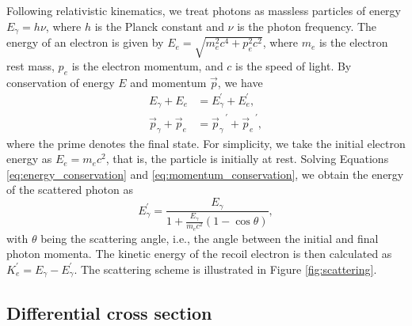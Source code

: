 \documentclass[aps,twocolumn,secnumarabic,balancelastpage,amsmath,amssymb,nofootinbib,floatfix]{revtex4-1}
\begin{document}
Following relativistic kinematics, we treat photons as massless particles of energy $E_\gamma = h \nu$, where $h$ is the Planck constant and $\nu$ is the photon frequency. The energy of an electron is given by $E_e = \sqrt{m_e^2 c^4 + p_e^2 c^2}$, where $m_e$ is the electron rest mass, $p_e$ is the electron momentum, and $c$ is the speed of light. By conservation of energy $E$ and momentum $\vec{p}$, we have
\begin{align}
    \label{eq:energy_conservation}
    E_\gamma + E_e &= E_\gamma^{\prime} + E_e^{\prime}, \\
    \label{eq:momentum_conservation}
    \vec{p}_\gamma + \vec{p}_e &= {\vec{p}_\gamma}^{\,\prime} + {\vec{p}_e}^{\,\prime},
\end{align}
where the prime denotes the final state. For simplicity, we take the initial electron energy as $E_e = m_e c^2$, that is, the particle is initially at rest. Solving Equations \eqref{eq:energy_conservation} and \eqref{eq:momentum_conservation}, we obtain the energy of the scattered photon as
\begin{equation}
    \label{eq:scattered_photon_energy}
    E_\gamma^{\prime} = \frac{E_\gamma}{1 + \frac{E_\gamma}{m_e c^2} (1 - \cos \theta)},
\end{equation}
with $\theta$ being the scattering angle, i.e., the angle between the initial and final photon momenta. The kinetic energy of the recoil electron is then calculated as $K_e^{\prime} = E_\gamma - E_\gamma^{\prime}$. The scattering scheme is illustrated in Figure \ref{fig:scattering}.


\subsection{Differential cross section}
\label{ssec:differential_cross_section}
\end{document}
